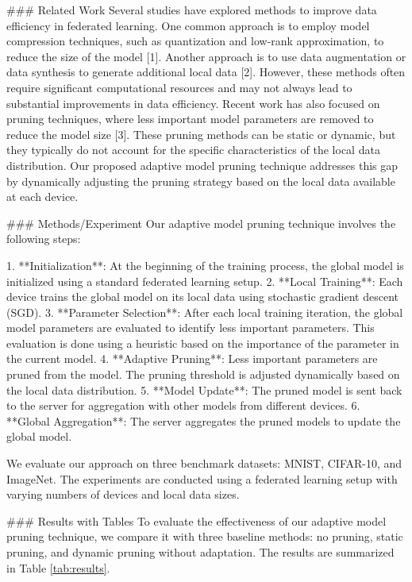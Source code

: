 ### Related Work
Several studies have explored methods to improve data efficiency in federated learning. One common approach is to employ model compression techniques, such as quantization and low-rank approximation, to reduce the size of the model [1]. Another approach is to use data augmentation or data synthesis to generate additional local data [2]. However, these methods often require significant computational resources and may not always lead to substantial improvements in data efficiency. Recent work has also focused on pruning techniques, where less important model parameters are removed to reduce the model size [3]. These pruning methods can be static or dynamic, but they typically do not account for the specific characteristics of the local data distribution. Our proposed adaptive model pruning technique addresses this gap by dynamically adjusting the pruning strategy based on the local data available at each device.

### Methods/Experiment
Our adaptive model pruning technique involves the following steps:

1. **Initialization**: At the beginning of the training process, the global model is initialized using a standard federated learning setup.
2. **Local Training**: Each device trains the global model on its local data using stochastic gradient descent (SGD).
3. **Parameter Selection**: After each local training iteration, the global model parameters are evaluated to identify less important parameters. This evaluation is done using a heuristic based on the importance of the parameter in the current model.
4. **Adaptive Pruning**: Less important parameters are pruned from the model. The pruning threshold is adjusted dynamically based on the local data distribution.
5. **Model Update**: The pruned model is sent back to the server for aggregation with other models from different devices.
6. **Global Aggregation**: The server aggregates the pruned models to update the global model.

We evaluate our approach on three benchmark datasets: MNIST, CIFAR-10, and ImageNet. The experiments are conducted using a federated learning setup with varying numbers of devices and local data sizes.

### Results with Tables
To evaluate the effectiveness of our adaptive model pruning technique, we compare it with three baseline methods: no pruning, static pruning, and dynamic pruning without adaptation. The results are summarized in Table \ref{tab:results}.

